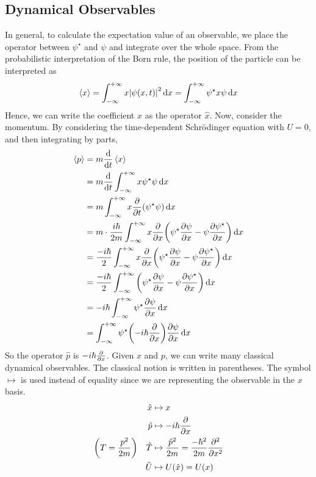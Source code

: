 \subsection{Dynamical Observables}
In general, to calculate the expectation value of an observable, we place the operator between \( \psi^\star \) and \( \psi \) and integrate over the whole space.
From the probabilistic interpretation of the Born rule, the position of the particle can be interpreted as
\[
	\left\langle{x}\right\rangle = \int_{-\infty}^{+\infty} x \abs{\psi(x,t)}^2 \dd{x} = \int_{-\infty}^{+\infty} \psi^\star x \psi \dd{x}
\]
Hence, we can write the coefficient \( x \) as the operator \( \hat x \).
Now, consider the momentum.
By considering the time-dependent Schr\"odinger equation with \( U = 0 \), and then integrating by parts,
\begin{align*}
	\left\langle{p}\right\rangle & = m \dv{t} \left\langle{x}\right\rangle                                                                                                              \\
	          & = m \dv{t} \int_{-\infty}^{+\infty} x \psi^\star \psi \dd{x}                                                                      \\
	          & = m \int_{-\infty}^{+\infty} x \pdv{t} \qty( \psi^\star \psi ) \dd{x}                                                             \\
	          & = m \cdot \frac{i \hbar}{2m} \int_{-\infty}^{+\infty} x \pdv{x}\qty( \psi^\star \pdv{\psi}{x} - \psi \pdv{\psi^\star}{x} ) \dd{x} \\
	          & = \frac{-i \hbar}{2} \int_{-\infty}^{+\infty} x \pdv{x}\qty( \psi^\star \pdv{\psi}{x} - \psi \pdv{\psi^\star}{x} ) \dd{x}         \\
	          & = \frac{-i \hbar}{2} \int_{-\infty}^{+\infty} \qty( \psi^\star \pdv{\psi}{x} - \psi \pdv{\psi^\star}{x} ) \dd{x}                  \\
	          & = -i \hbar \int_{-\infty}^{+\infty} \psi^\star \pdv{\psi}{x} \dd{x}                                                               \\
	          & = \int_{-\infty}^{+\infty} \psi^\star \qty(-i \hbar \pdv{x} ) \pdv{\psi}{x} \dd{x}
\end{align*}
So the operator \( \hat p \) is \( -i \hbar \pdv{x} \).
Given \( x \) and \( p \), we can write many classical dynamical observables.
The classical notion is written in parentheses.
The symbol \( \mapsto \) is used instead of equality since we are representing the observable in the \( x \) basis.
\begin{align*}
	\hat x                               & \mapsto x                                                    \\
	\hat p                               & \mapsto -i\hbar \pdv{x}                                      \\
	\qty(T = \frac{p^2}{2m})\quad \hat T & \mapsto \frac{\hat p^2}{2m} = \frac{-\hbar^2}{2m} \pdv[2]{x} \\
	\hat U                               & \mapsto U(\hat x) = U(x)
\end{align*}

